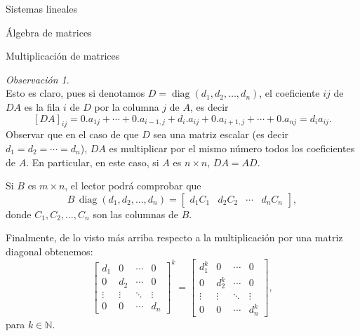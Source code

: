 \documentclass[a4paper,12pt,twoside,spanish,reqno]{amsbook}
\numberwithin{equation}{section}
\theoremstyle{definition}
\theoremstyle{remark}
\newtheorem{observacion}[teorema]{Observaci\'on}
\begin{document}
\begin{chapter}{Sistemas lineales}
\begin{section}{Álgebra de matrices}
\begin{subsection}{Multiplicación de matrices}
\begin{observacion}
\begin{equation*}
                \end{equation*}
                Esto es claro, pues si denotamos $D = \operatorname{diag}(d_1,d_2,\ldots,d_n)$, el coeficiente $ij$  de $DA$ es la fila $i$ de $D$ por la columna $j$ de $A$, es decir
                $$
                [DA]_{ij} = 0.a_{1j}+\cdots + 0.a_{i-1,j}+d_i.a_{ij}+0.a_{i+1,j}+\cdots + 0.a_{nj} = d_ia_{ij}. 
                $$
                Observar que en el caso de que $D$ sea una matriz escalar (es decir $d_1=d_2=\cdots=d_n$), $DA$ es multiplicar por el mismo número todos los coeficientes de $A$. En particular, en este caso, si $A$  es $n \times n$,  $DA = AD$.
                 
                
                
                 Si $B$ es $m \times n$, el lector podrá comprobar que 
                 \begin{equation*}
                     B\,\operatorname{diag}(d_1,d_2,\ldots,d_n) = \begin{bmatrix}
                         d_1C_1& d_2C_2& \cdots &d_nC_n
                     \end{bmatrix},
                 \end{equation*} 
                 donde $C_1,C_2,\ldots,C_n$ son las columnas de $B$.
                 
                 Finalmente,  de lo visto más arriba respecto a la multiplicación por una matriz diagonal obtenemos:
                 \begin{equation*}
                    \begin{bmatrix}
                        d_1 & 0 & \cdots &0 \\
                        0 & d_2 & \cdots &0 \\
                        \vdots & \vdots & \ddots &\vdots \\
                        0 & 0 & \cdots & d_n 
                        \end{bmatrix}^k =
                        \begin{bmatrix}
                            d_1^k & 0 & \cdots &0 \\
                            0 & d_2^k & \cdots &0 \\
                            \vdots & \vdots & \ddots &\vdots \\
                            0 & 0 & \cdots & d_n^k 
                            \end{bmatrix} ,
                 \end{equation*}
                 para $k \in \mathbb N$.
                

\end{observacion}
\end{subsection}
\end{section}
\end{chapter}
\end{document}
